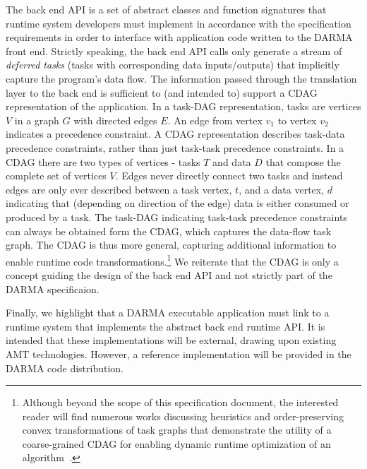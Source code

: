 The \gls{back end} \gls{API} is a set of abstract classes and function
signatures that \gls{runtime system} developers must implement in accordance with the
specification requirements in order to interface with application code written
to the \gls{DARMA} front end. 
Strictly speaking, the \gls{back end} \gls{API} calls only generate a stream of
\emph{deferred tasks} (tasks with corresponding data inputs/outputs) that
implicitly capture the program's data flow.
The information passed through the \gls{translation layer} to
the \gls{back end} is sufficient
to (and intended to) support a \gls{CDAG} representation of the application.
In a \gls{task-DAG} representation, tasks are vertices $V$ in a graph $G$ with directed edges $E$.
An edge from vertex $v_1$ to vertex $v_2$ indicates a precedence constraint.
A \gls{CDAG} representation describes task-data precedence constraints, rather
than just task-task precedence constraints.  In a \gls{CDAG} there are two
types of vertices - tasks $T$ and data $D$ that compose the complete set of vertices $V$.
Edges never directly connect two tasks and instead edges are only ever described between a task vertex, $t$, and a data vertex, $d$
indicating that (depending on direction of the edge) data is either consumed or produced by a task.
The \gls{task-DAG} indicating task-task precedence constraints can always be
obtained form the \gls{CDAG}, which captures the data-flow task graph.
The \gls{CDAG} is thus more general, capturing additional information to
enable runtime code transformations.\footnote{
Although beyond the scope of this specification document, the interested reader
will find numerous works discussing heuristics and order-preserving convex
transformations of task graphs that demonstrate the utility of a coarse-grained
\gls{CDAG} for enabling dynamic runtime optimization of an
algorithm~\cite{missingCitations}.
}
We reiterate that the \gls{CDAG} is only a concept guiding the design
of the \gls{back end} \gls{API} and not strictly part of the \gls{DARMA} specificaion.


Finally, we highlight that a \gls{DARMA} executable application must link to a \gls{runtime
  system} that implements the abstract \gls{back end} runtime \gls{API}.
It is intended that these implementations will be external, drawing upon
existing AMT technologies.  However,  a reference implementation will be provided
in the \gls{DARMA} code distribution.










